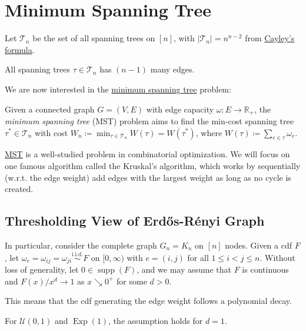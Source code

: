 \section{Minimum Spanning Tree}
Let \(\mathcal{T} _n\) be the set of all spanning trees on \([n]\), with \(\lvert \mathcal{T} _n \rvert = n^{n-2}\) from \hyperref[thm:Cayley-formula]{Cayley's formula}.

\begin{note}
	All spanning trees \(\tau \in \mathcal{T} _n\) has \((n-1)\) many edges.
\end{note}

We are now interested in the \hyperref[prb:MST]{minimum spanning tree} problem:

\begin{problem}\label{prb:MST}
Given a connected graph \(G=(V, E)\) with edge capacity \(\omega \colon E \to \mathbb{R} _{+} \), the \emph{minimum spanning tree} (MST) problem aims to find the min-cost spanning tree \(\tau ^{\ast} \in \mathcal{T} _n\) with cost \(W_n \coloneqq \min _{\tau \in \mathcal{T} _n} W(\tau ) = W(\tau ^{\ast} )\), where \(W(\tau ) \coloneqq \sum_{e \in \tau } \omega _e \).
\end{problem}

\hyperref[prb:MST]{MST} is a well-studied problem in combinatorial optimization. We will focus on one famous algorithm called the Kruskal's algorithm, which works by sequentially (w.r.t. the edge weight) add edges with the largest weight as long as no cycle is created.

\subsection{Thresholding View of Erdős-Rényi Graph}
In particular, consider the complete graph \(G_n = K_n\) on \([n]\) nodes. Given a cdf \(F\), let \(\omega _e = \omega _{ij} = \omega _{ji} \overset{\text{i.i.d.} }{\sim } F\) on \([0, \infty )\) with \(e = (i, j)\) for all \(1 \leq i < j \leq n\). Without loss of generality, let \(0 \in \operatorname{supp}(F) \), and we may assume that \(F\) is continuous and \(F(x) / x^d \to 1\) as \(x \searrow 0^+\) for some \(d > 0\).

\begin{intuition}
	This means that the cdf generating the edge weight follows a polynomial decay.
\end{intuition}

\begin{eg}
	For \(\mathcal{U} (0, 1)\) and \(\operatorname{Exp}(1) \), the assumption holds for \(d=1\).
\end{eg}

